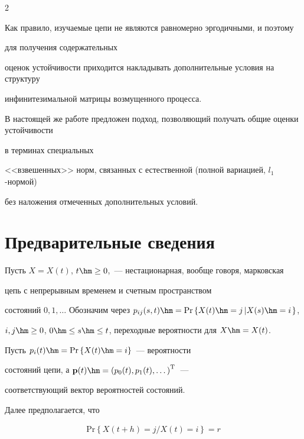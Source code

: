\begin{multicols}{2}
{}






Как правило, изучаемые цепи не являются равномерно эргодичными, и поэтому

для получения содержательных

оценок устойчивости приходится накладывать дополнительные условия на структуру

инфинитезимальной матрицы возмущенного процесса.






В настоящей же работе предложен подход, поз\-во\-ля\-ющий получать общие оценки устойчивости

в терминах специальных

<<взвешенных>> норм, связанных с естественной (полной вариацией, $l_1$-нор\-мой)

без наложения отмеченных дополнительных условий.





\section{Предварительные сведения}



Пусть $X=X(t)$, $t\hm\geq 0$,~--- нестационарная, вообще говоря, марковская

цепь с непрерывным временем и счетным пространством

состояний $0,1,\dots$ Обозначим через $p_{ij}(s,t)\hm=

\mathrm{Pr}\left\{ X(t)\hm=j\left| X(s)\hm=i\right. \right\}$,

$i,j \hm\ge 0$, $0\hm\leq s\hm\leq t$, переходные вероятности для $X\hm=X(t)$.

Пусть $p_i(t)\hm=\mathrm{Pr}\left\{ X(t) \hm=i \right\}$~--- вероятности

состояний цепи, а ${\bf p}(t) \hm= \left(p_0(t), p_1(t), \dots\right)^{\mathrm{T}}$~---

соответствующий вектор вероятностей состояний.

Далее предполагается, что

\begin{multline*}

\mathrm{Pr}\left\{X\left( t+h\right) =j/X\left( t\right) =i\right\} ={}r\\


\end{multline*}
\end{multicols}
